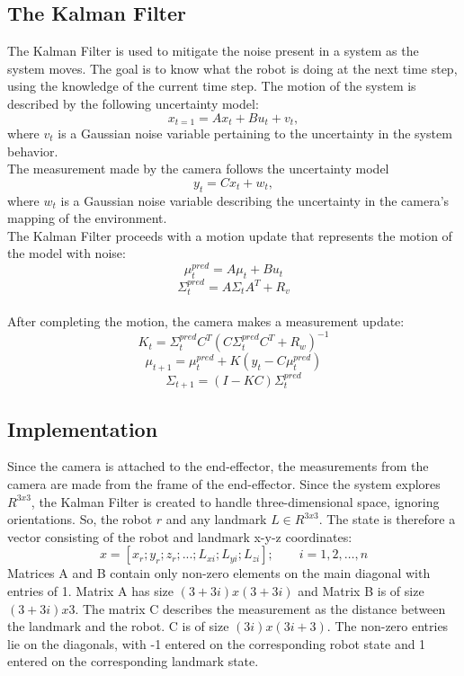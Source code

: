 \subsection*{The Kalman Filter}
The Kalman Filter is used to mitigate the noise present in a system as the system moves.  The goal is to know what the robot is doing at the next time step, using the knowledge of the current time step.  The motion of the system is described by the following uncertainty model:
\begin{equation}
    x_{t=1}=Ax_t+Bu_t+v_t,
\end{equation}
where $v_t$ is a Gaussian noise variable pertaining to the uncertainty in the system behavior.
\\
The measurement made by the camera follows the uncertainty model
\begin{equation}
    y_t=Cx_t+w_t,
\end{equation}
where $w_t$ is a Gaussian noise variable describing the uncertainty in the camera's mapping of the environment.
\\
The Kalman Filter proceeds with a motion update that represents the motion of the model with noise:
\begin{equation}
    \mu_t^{pred}=A\mu_t+Bu_t
\end{equation}
\begin{equation}
    \Sigma_t^{pred}=A\Sigma_tA^T+R_v
\end{equation}
\\
After completing the motion, the camera makes a measurement update:
\begin{equation}
    K_t=\Sigma_t^{pred}C^{T}(C\Sigma_t^{pred}C^{T}+R_w)^{-1}
\end{equation}
\begin{equation}
    \mu_{t+1}=\mu_t^{pred}+K(y_t-C\mu_t^{pred})
\end{equation}
\begin{equation}
    \Sigma_{t+1}=(I-KC)\Sigma_t^{pred}
\end{equation}

\subsection*{Implementation}
Since the camera is attached to the end-effector, the measurements from the camera are made from the frame of the end-effector.  Since the system explores $R^{3x3}$, the Kalman Filter is created to handle three-dimensional space, ignoring orientations.  So, the robot $r$ and any landmark $L \in R^{3x3}$.  The state is therefore a vector consisting of the robot and landmark x-y-z coordinates:
\begin{equation}
    x=[x_r;y_r;z_r;...;L_{xi};L_{yi};L_{zi}]; \qquad i = 1,2,\dots,n
\end{equation}
Matrices A and B contain only non-zero elements on the main diagonal with entries of 1.  Matrix A has size $(3+3i)x(3+3i)$ and Matrix B is of size $(3+3i)x3$.  The matrix C describes the measurement as the distance between the landmark and the robot.  C is of size $(3i)x(3i+3)$.  The non-zero entries lie on the diagonals, with -1 entered on the corresponding robot state and 1 entered on the corresponding landmark state.